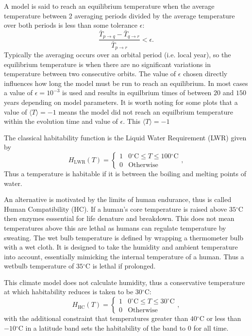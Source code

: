 \documentclass[12pt, onecolumn]{revtex4-2}    %
\newcommand{\degreesC}{\ensuremath{^{\circ}\text{C}}}
\begin{document}
A model is said to reach an equilibrium temperature when the average temperature between 2 averaging periods divided by the average temperature over both periods is less than some tolerance $\epsilon$:
\begin{equation}
  \frac{\bar{T}_{p \to q} - \bar{T}_{q \to r}}{\bar{T}_{p \to r}} < \epsilon.
  \label{eq:T_equilb}
\end{equation}
Typically the averaging occurs over an orbital period (i.e. local year), so the equilibrium temperature is when there are no significant variations in temperature between two consecutive orbits.
The value of $\epsilon$ chosen directly influences how long the model must be run to reach an equilibrium.
In most cases a value of $\epsilon = 10^{-3}$ is used and results in equilbrium times of between $20$ and $150$ years depending on model parameters.
It is worth noting for some plots that a value of $\langle T \rangle = -1$ means the model did not reach an equilbrium temperature within the evolution time and value of $\epsilon$.
This $\langle T \rangle = -1$

The classical habitability function is the Liquid Water Requirement (LWR) given by
\begin{equation}
  H_\text{LWR}(T) =
  \begin{cases}
    1 & 0\degreesC \le T \le 100\degreesC \\
    0 & \text{Otherwise}
  \end{cases},
  \label{eq:H_LWR_}
\end{equation}
Thus a temperature is habitable if it is between the boiling and melting points of water.

An alternative is motivated by the limits of human endurance, thus is called Human Compatibility (HC).
If a human's core temperature is raised above $35\degreesC$ then enzymes esssential for life denature and breakdown.
This does not mean temperatures above this are lethal as humans can regulate temperature by sweating.
The wet bulb temperature is defined by wrapping a thermometer bulb with a wet cloth.
It is designed to take the humidity and ambient temperature into account, essentially mimicking the internal temperature of a human.
Thus a wetbulb temperature of $35\degreesC$ is lethal if prolonged.

This climate model does not calculate humidity,
thus a conservative temperature at which habitability reduces is taken to be $30\degreesC$:
\begin{equation}
  H_\text{HC}(T) =
  \begin{cases}
    1 & 0\degreesC \le T \le 30\degreesC \\
    0 & \text{Otherwise}
  \end{cases},
  \label{eq:H_HC_}
\end{equation}
with the additional constraint that temperatures greater than $40\degreesC$ or less than $-10\degreesC$ in a latitude band sets the habitability of the band to 0 for all time.
\end{document}
